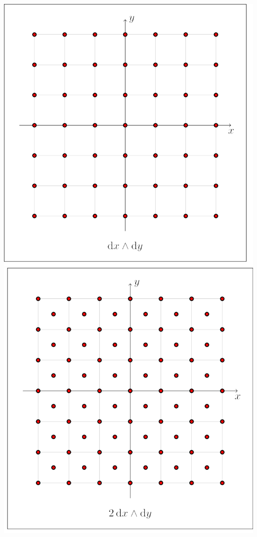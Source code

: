 \documentclass[20pt,margin=1in,innermargin=-4.5in,blockverticalspace=-0.25in]{tikzposter}
\begin{document}
\begin{columns}
{            \begin{center}
                \includegraphics[scale=0.3]{dxdyform.png} \quad
                \includegraphics[scale=0.3]{2dxdyform.png} \quad

\end{center}}
\end{columns}
\end{document}
